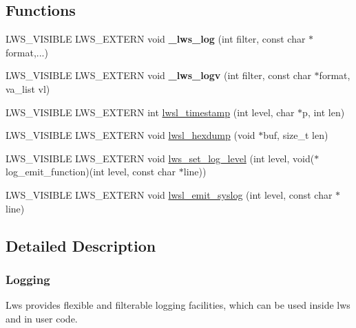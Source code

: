 \subsection*{Functions}
\begin{DoxyCompactItemize}
\item 
L\+W\+S\+\_\+\+V\+I\+S\+I\+B\+LE L\+W\+S\+\_\+\+E\+X\+T\+E\+RN void {\bfseries \+\_\+lws\+\_\+log} (int filter, const char $\ast$format,...)\hypertarget{group__log_gaf5f07837692b2f231a79da8a058288aa}{}\label{group__log_gaf5f07837692b2f231a79da8a058288aa}

\item 
L\+W\+S\+\_\+\+V\+I\+S\+I\+B\+LE L\+W\+S\+\_\+\+E\+X\+T\+E\+RN void {\bfseries \+\_\+lws\+\_\+logv} (int filter, const char $\ast$format, va\+\_\+list vl)\hypertarget{group__log_ga74eb146969f0595e12ea835851b4588e}{}\label{group__log_ga74eb146969f0595e12ea835851b4588e}

\item 
L\+W\+S\+\_\+\+V\+I\+S\+I\+B\+LE L\+W\+S\+\_\+\+E\+X\+T\+E\+RN int \hyperlink{group__log_ga42e39775c6b69b7251bdbf5a2cdd5dcd}{lwsl\+\_\+timestamp} (int level, char $\ast$p, int len)
\item 
L\+W\+S\+\_\+\+V\+I\+S\+I\+B\+LE L\+W\+S\+\_\+\+E\+X\+T\+E\+RN void \hyperlink{group__log_ga898b1f03872ad019f507d4e35bbefa90}{lwsl\+\_\+hexdump} (void $\ast$buf, size\+\_\+t len)
\item 
L\+W\+S\+\_\+\+V\+I\+S\+I\+B\+LE L\+W\+S\+\_\+\+E\+X\+T\+E\+RN void \hyperlink{group__log_ga244647f9e1bf0097ccdde66d74f41e26}{lws\+\_\+set\+\_\+log\+\_\+level} (int level, void($\ast$log\+\_\+emit\+\_\+function)(int level, const char $\ast$line))
\item 
L\+W\+S\+\_\+\+V\+I\+S\+I\+B\+LE L\+W\+S\+\_\+\+E\+X\+T\+E\+RN void \hyperlink{group__log_gab7c0fc936cc9f1eb58e2bb234c15147c}{lwsl\+\_\+emit\+\_\+syslog} (int level, const char $\ast$line)
\end{DoxyCompactItemize}


\subsection{Detailed Description}
\subsubsection*{Logging}

Lws provides flexible and filterable logging facilities, which can be used inside lws and in user code.

